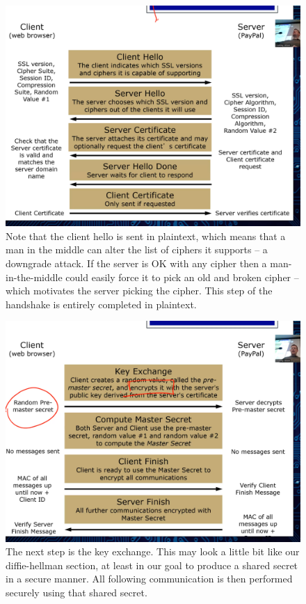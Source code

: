 \documentclass[../notes.tex]{subfiles}
\begin{document}
\begin{figure}[H]
    \centering
    \includegraphics[width=0.8\linewidth]{img/image_2023-03-12-19-26-10.png}
    \caption{Note that the client hello is sent in plaintext, which means that a man in the middle can alter the list of ciphers it supports -- a downgrade attack. If the server is OK with any cipher then a man-in-the-middle could easily force it to pick an old and broken cipher -- which motivates the server picking the cipher. This step of the handshake is entirely completed in plaintext.}
\end{figure}





\begin{figure}[H]
    \centering
    \includegraphics[width=0.8\linewidth]{img/image_2023-03-12-19-40-24.png}
    \caption{ The next step is the key exchange. This may look a little bit like our diffie-hellman section, at least in our goal to produce a shared secret in a secure manner. All following communication is then performed securely using that shared secret. }
\end{figure}
\end{document}
